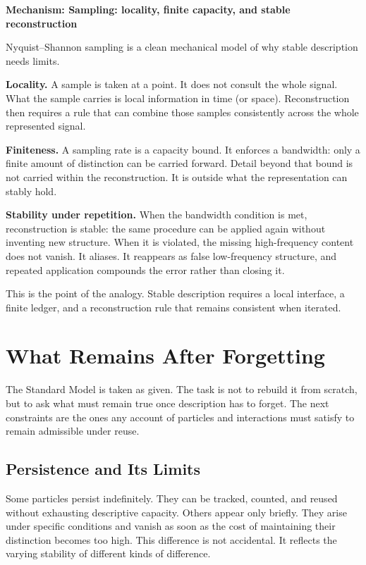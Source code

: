 \documentclass[11pt,twoside,openright]{book}
\newenvironment{mechanismbox}[1]
  {\begin{framed}\noindent\textbf{Mechanism: #1}\par\medskip}
  {\end{framed}}
\begin{document}
\begin{mechanismbox}{Sampling: locality, finite capacity, and stable reconstruction}
Nyquist--Shannon sampling is a clean mechanical model of why stable description needs limits.

\textbf{Locality.}
A sample is taken at a point.
It does not consult the whole signal.
What the sample carries is local information in time (or space).
Reconstruction then requires a rule that can combine those samples consistently across the whole represented signal.

\textbf{Finiteness.}
A sampling rate is a capacity bound.
It enforces a bandwidth: only a finite amount of distinction can be carried forward.
Detail beyond that bound is not carried within the reconstruction.
It is outside what the representation can stably hold.

\textbf{Stability under repetition.}
When the bandwidth condition is met, reconstruction is stable:
the same procedure can be applied again without inventing new structure.
When it is violated, the missing high-frequency content does not vanish.
It aliases.
It reappears as false low-frequency structure, and repeated application compounds the error rather than closing it.

This is the point of the analogy.
Stable description requires a local interface, a finite ledger, and a reconstruction rule that remains consistent when iterated.
\end{mechanismbox}

\chapter{What Remains After Forgetting}

The Standard Model is taken as given. The task is not to rebuild it from scratch, but to ask what must remain true once description has to forget. The next constraints are the ones any account of particles and interactions must satisfy to remain admissible under reuse.

\section*{Persistence and Its Limits}

Some particles persist indefinitely. They can be tracked, counted, and reused without exhausting descriptive capacity. Others appear only briefly. They arise under specific conditions and vanish as soon as the cost of maintaining their distinction becomes too high. This difference is not accidental. It reflects the varying stability of different kinds of difference.
\end{document}
